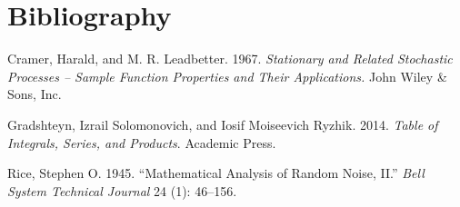 \documentclass[11pt,]{article}
\theoremstyle{nonumberplain}
\begin{document}
\section*{Bibliography}\label{bibliography}

\hypertarget{refs}{}
\hypertarget{ref-cramer1967stationary}{}
Cramer, Harald, and M. R. Leadbetter. 1967. \emph{Stationary and Related
Stochastic Processes -- Sample Function Properties and Their
Applications.} John Wiley \& Sons, Inc.

\hypertarget{ref-gradshteyn2014table}{}
Gradshteyn, Izrail Solomonovich, and Iosif Moiseevich Ryzhik. 2014.
\emph{Table of Integrals, Series, and Products}. Academic Press.

\hypertarget{ref-rice1945mathematical}{}
Rice, Stephen O. 1945. ``Mathematical Analysis of Random Noise, II.''
\emph{Bell System Technical Journal} 24 (1): 46--156.
\end{document}
